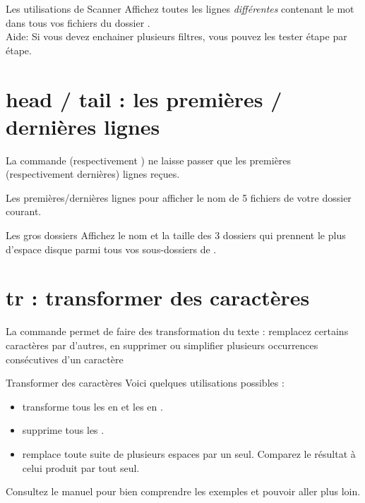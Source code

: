 \documentclass[a4paper,11pt]{style-esi/td}
\begin{document}
		\begin{Exercice}{Les utilisations de Scanner}
			Affichez toutes les lignes \emph{différentes}
			contenant le mot  dans tous vos fichiers 
			du dossier .
			\\Aide: 
			Si vous devez enchainer plusieurs filtres,
			vous pouvez les tester étape par étape.
		\end{Exercice}

	\section{head / tail : les premières / dernières lignes}
	
		La commande  (respectivement )
		ne laisse passer que les premières (res\-pec\-ti\-ve\-ment 
		dernières)
		lignes reçues.

		\begin{Experience}{Les premières/dernières lignes}
			pour afficher le nom de 5 fichiers  de votre dossier courant.
		\end{Experience}

		\begin{Exercice}{Les gros dossiers}
			Affichez le nom et la taille des 3 dossiers 
			qui prennent le plus d'espace disque 
			parmi tous vos sous-dossiers de . 
		\end{Exercice}

	\section{tr : transformer des caractères}
	
		La commande  permet de faire des transformation du texte :
		remplacez certains caractères par d'autres, en supprimer ou simplifier 
		plusieurs occurrences consécutives d'un caractère 

		\begin{Exemple}{Transformer des caractères}
			Voici quelques utilisations possibles :
			\begin{itemize}
			\item 
				transforme tous les  en 
				et les  en .
			\item
				supprime tous les .
			\item 
				remplace toute suite de plusieurs espaces par un seul.
				Comparez le résultat à celui produit par  tout seul.
			\end{itemize}
			Consultez le manuel pour bien comprendre les exemples
			et pouvoir aller plus loin.
		\end{Exemple}
\end{document}
